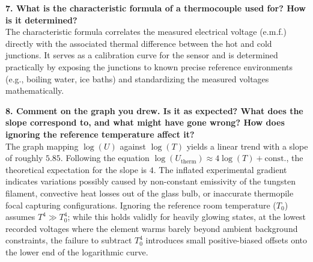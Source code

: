 \documentclass[journal]{IEEEtran}
\begin{document}
\textbf{7. What is the characteristic formula of a thermocouple used for? How is it determined?} \\
The characteristic formula correlates the measured electrical voltage (e.m.f.) directly with the associated thermal difference between the hot and cold junctions. It serves as a calibration curve for the sensor and is determined practically by exposing the junctions to known precise reference environments (e.g., boiling water, ice baths) and standardizing the measured voltages mathematically. 

\textbf{8. Comment on the graph you drew. Is it as expected? What does the slope correspond to, and what might have gone wrong? How does ignoring the reference temperature affect it?} \\
The graph mapping $\log(U)$ against $\log(T)$ yields a linear trend with a slope of roughly $5.85$. Following the equation $\log(U_{\text{therm}}) \approx 4\log(T) + \text{const.}$, the theoretical expectation for the slope is $4$. The inflated experimental gradient indicates variations possibly caused by non-constant emissivity of the tungsten filament, convective heat losses out of the glass bulb, or inaccurate thermopile focal capturing configurations. Ignoring the reference room temperature ($T_0$) assumes $T^4 \gg T_0^4$; while this holds validly for heavily glowing states, at the lowest recorded voltages where the element warms barely beyond ambient background constraints, the failure to subtract $T_0^4$ introduces small positive-biased offsets onto the lower end of the logarithmic curve. 
\end{document}
